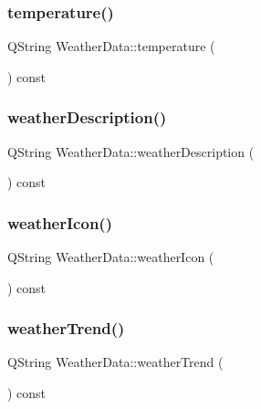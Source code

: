 \subsubsection{\texorpdfstring{temperature()}{temperature()}}
{\footnotesize\ttfamily Q\+String Weather\+Data\+::temperature (\begin{DoxyParamCaption}{ }\end{DoxyParamCaption}) const}

\mbox{\label{class_weather_data_a63a3528697c8681bd32d4d170ec91f76}} 
\subsubsection{\texorpdfstring{weather\+Description()}{weatherDescription()}}
{\footnotesize\ttfamily Q\+String Weather\+Data\+::weather\+Description (\begin{DoxyParamCaption}{ }\end{DoxyParamCaption}) const}

\mbox{\label{class_weather_data_a5baf2d9cc08741d7af4a07d61df95ee4}} 
\subsubsection{\texorpdfstring{weather\+Icon()}{weatherIcon()}}
{\footnotesize\ttfamily Q\+String Weather\+Data\+::weather\+Icon (\begin{DoxyParamCaption}{ }\end{DoxyParamCaption}) const}

\mbox{\label{class_weather_data_a04b09d8065d64b62f1ad679b4493fc62}} 
\subsubsection{\texorpdfstring{weather\+Trend()}{weatherTrend()}}
{\footnotesize\ttfamily Q\+String Weather\+Data\+::weather\+Trend (\begin{DoxyParamCaption}{ }\end{DoxyParamCaption}) const}



